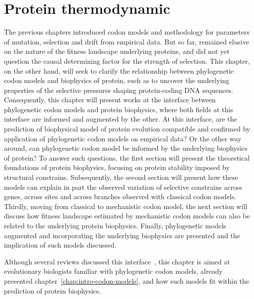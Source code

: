 \chapter{Protein thermodynamic}
{\hypersetup{linkcolor=GREYDARK}\minitoc}
\label{chap:intro-physic-proteins}

The previous chapters introduced codon models and methodology for parameters of mutation, selection and drift from empirical data. But so far, remained elusive on the nature of the fitness landscape underlying proteins, and did not yet question the causal determining factor for the strength of selection.
This chapter, on the other hand, will seek to clarify the relationship between phylogenetic codon models and biophysics of protein, such as to uncover the underlying properties of the selective pressures shaping protein-coding \acrshort{DNA} sequences.
Consequently, this chapter will present works at the interface between phylogenetic codon models and protein biophysics, where both fields at this interface are informed and augmented by the other. 
At this interface, are the prediction of biophysical model of protein evolution compatible and confirmed by application of phylogenetic codon models on empirical data?
Or the other way around, can phylogenetic codon model be informed by the underlying biophysics of protein?
To answer such questions, the first section will present the theoretical foundations of protein biophysics, focusing on protein stability imposed by structural constrains.
Subsequently, the second section will present how these models can explain in part the observed variation of selective constrains across genes, across sites and across branches observed with classical codon models.
Thirdly, moving from classical to mechanistic codon model, the next section will discuss how fitness landscape estimated by mechanistic codon models can also be related to the underlying protein biophysics.
Finally, phylogenetic models augmented and incorporating the underlying biophysics are presented and the implication of such models discussed.

Although several reviews discussed this interface~\citep{Liberles2012,Serohijos2014,Sikosek2014,Arenas2015,Echave2017,Bastolla2017}, this chapter is aimed at evolutionary biologists familiar with phylogenetic codon models, already presented chapter~\ref{chap:intro-codon-models}, and how such models fit within the prediction of protein biophysics.

